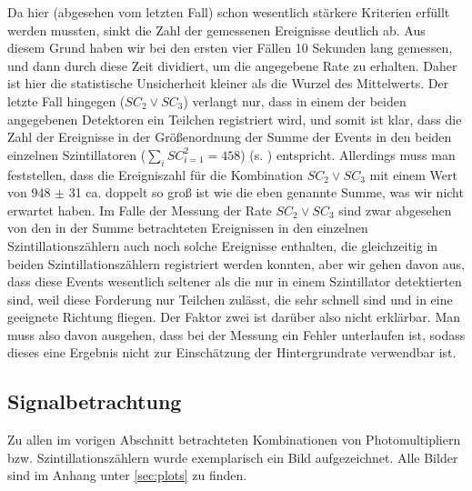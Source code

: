 Da hier (abgesehen vom letzten Fall) schon wesentlich stärkere Kriterien erfüllt
werden mussten, sinkt die Zahl der gemessenen Ereignisse deutlich ab. Aus
diesem Grund haben wir bei den ersten vier Fällen 10 Sekunden lang gemessen,
und dann durch diese Zeit dividiert, um die angegebene Rate zu erhalten. Daher
ist hier die statistische Unsicherheit kleiner als die Wurzel des Mittelwerts.
Der letzte Fall hingegen ($SC_2 \vee SC_3$) verlangt nur, dass in einem der
beiden angegebenen Detektoren ein Teilchen registriert wird, und somit ist
klar, dass die Zahl der Ereignisse in der Größenordnung der Summe der Events in
den beiden einzelnen Szintillatoren ($\sum_i SC_{i=1}^2 = 458 $) (s.
) entspricht. Allerdings muss man feststellen,
dass die Ereigniszahl für die Kombination $SC_2 \vee SC_3$ mit einem Wert von
948 $\pm$ 31 ca. doppelt so groß ist wie die eben genannte Summe, was wir nicht
erwartet haben. Im Falle der Messung der Rate $SC_2 \vee SC_3$ sind zwar
abgesehen von den in der Summe betrachteten Ereignissen in den einzelnen
Szintillationszählern auch noch solche Ereignisse enthalten, die gleichzeitig
in beiden Szintillationszählern registriert werden konnten, aber wir gehen
davon aus, dass diese Events wesentlich seltener als die nur in einem
Szintillator detektierten sind, weil diese Forderung nur Teilchen zulässt, die
sehr schnell sind und in eine geeignete Richtung fliegen. Der Faktor zwei ist
darüber also nicht erklärbar. Man muss also davon ausgehen, dass bei der
Messung ein Fehler unterlaufen ist, sodass dieses eine Ergebnis nicht zur
Einschätzung der Hintergrundrate verwendbar ist.

\subsection{Signalbetrachtung}
Zu allen im vorigen Abschnitt betrachteten Kombinationen von Photomultipliern
bzw. Szintillationszählern wurde exemplarisch ein Bild aufgezeichnet. Alle
Bilder sind im Anhang unter \ref{sec:plots} zu finden. 


